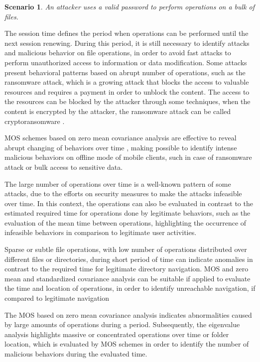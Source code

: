 \documentclass[twocolumn]{svjour3}          	%
\newtheorem{thm}{Scenario}
\begin{document}
\begin{thm}
An attacker uses a valid password to perform operations on a bulk of files.
\end{thm}

The session time defines the period when operations can be performed until the next session renewing. During this period, it is still necessary to identify attacks and malicious behavior on file operations, in order to avoid fast attacks to perform unauthorized access to information or data modification. Some attacks present behavioral patterns based on abrupt number of operations, such as the ransomware attack, which is a growing attack \cite{McAfee2015} that blocks the access to valuable resources and requires a payment in order to unblock the content. The access to the resources can be blocked by the attacker through some techniques, when the content is encrypted by the attacker, the ransomware attack can be called cryptoransomware \cite{kaspersky2014}.

MOS schemes based on zero mean covariance analysis are effective to reveal abrupt changing of behaviors over time \cite{tenorio2013greatest}, making possible to identify intense malicious behaviors on offline mode of mobile clients, such in case of ransomware attack or bulk access to sensitive data.

The large number of operations over time is a well-known pattern of some attacks, due to the efforts on security measures to make the attacks infeasible over time. In this context, the operations can also be evaluated in contrast to the estimated required time for operations done by legitimate behaviors, such as the evaluation of the mean time between operations, highlighting the occurrence of infeasible behaviors in comparison to legitimate user activities.

Sparse or subtle file operations, with low number of operations distributed over different files or directories, during short period of time can indicate anomalies in contrast to the required time for legitimate directory navigation. MOS and zero mean and standardized covariance analysis can be suitable if applied to evaluate the time and location of operations, in order to identify unreachable navigation, if compared to legitimate navigation

The MOS based on zero mean covariance analysis indicates abnormalities caused by large amounts of operations during a period. Subsequently, the eigenvalue analysis highlights massive or concentrated operations over time or folder location, which is evaluated by MOS schemes in order to identify the number of malicious behaviors during the evaluated time.
\end{document}
